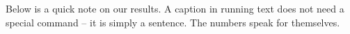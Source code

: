 \documentclass{article}
\begin{document}
Below is a quick note on our results. A caption in running text does
not need a special command -- it is simply a sentence. The numbers
speak for themselves.
\end{document}
